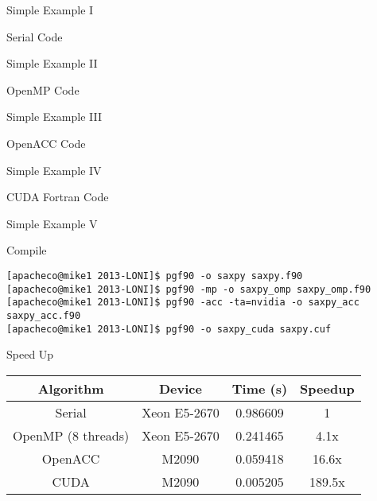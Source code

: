 \documentclass[c,mathserif,compress,xcolor=svgnames]{beamer}
\newenvironment{eblock}[0]
{
\begin{beamerboxesrounded}[upper=uppercol2,lower=lowercol2,shadow=true]}
{\end{beamerboxesrounded}}
\begin{document}
\begin{frame}[fragile]{\small Simple Example {\color{black}I}}
  \begin{eblock}{Serial Code}
     
  \end{eblock}
\end{frame}
\begin{frame}[fragile]{\small Simple Example {\color{black}II}}
  \begin{eblock}{OpenMP Code}
     
  \end{eblock}
\end{frame}
\begin{frame}[fragile]{\small Simple Example {\color{black}III}}
  \begin{eblock}{OpenACC Code}
     
  \end{eblock}
\end{frame}
\begin{frame}[fragile]{\small Simple Example {\color{black}IV}}
  \begin{eblock}{CUDA Fortran Code}
     
  \end{eblock}
\end{frame}

\begin{frame}[fragile]{\small Simple Example {\color{black}V}}
  \begin{eblock}{Compile}
    {\tiny
      \begin{Verbatim}
[apacheco@mike1 2013-LONI]$ pgf90 -o saxpy saxpy.f90
[apacheco@mike1 2013-LONI]$ pgf90 -mp -o saxpy_omp saxpy_omp.f90
[apacheco@mike1 2013-LONI]$ pgf90 -acc -ta=nvidia -o saxpy_acc saxpy_acc.f90
[apacheco@mike1 2013-LONI]$ pgf90 -o saxpy_cuda saxpy.cuf
      \end{Verbatim}
    }
  \end{eblock}
  \begin{eblock}{Speed Up}
    \begin{center}
      \begin{tabular}{|cccc|}
        \hline
        Algorithm & Device & Time (s) & Speedup \\
        \hline
        Serial & Xeon E5-2670 & 0.986609 & 1\\
        OpenMP (8 threads) & Xeon E5-2670 & 0.241465 & 4.1x\\
        OpenACC & M2090 & 0.059418 & 16.6x\\
        CUDA & M2090 & 0.005205 & 189.5x\\
        \hline
      \end{tabular}
    \end{center}
  \end{eblock}
\end{frame}
\end{document}
